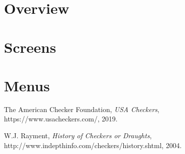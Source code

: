 \documentclass{scrreprt}
\begin{document}
	\section{Overview}
	\section{Screens}
	\section{Menus}

\begin{thebibliography}{9}

  The American Checker Foundation,
  \textit{USA Checkers},
  https://www.usacheckers.com/,
  2019.

W.J. Rayment,
\textit{History of Checkers or Draughts},
http://www.indepthinfo.com/checkers/history.shtml,
2004.

\end{thebibliography}
\end{document}
